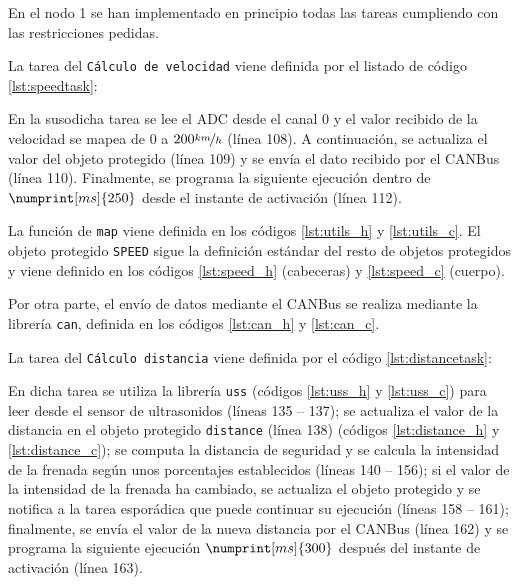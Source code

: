 En el nodo 1 se han implementado en principio todas las tareas cumpliendo con las
restricciones pedidas.

La tarea del \texttt{Cálculo de velocidad} viene definida por el listado de código
\ref{lst:speedtask}:



En la susodicha tarea se lee el ADC desde el canal 0 y el valor recibido de la velocidad
se mapea de $0$ a $200 \nicefrac{km}{h}$ (línea 108). A continuación, se actualiza el valor del
objeto protegido (línea 109) y se envía el dato recibido por el CANBus (línea 110).
Finalmente, se programa la siguiente ejecución dentro de $\numprint[ms]{250}$ desde el
instante de activación (línea 112).

La función de \texttt{map} viene definida en los códigos \ref{lst:utils_h} y \ref{lst:utils_c}.
El objeto protegido \texttt{SPEED} sigue la definición estándar del resto de objetos
protegidos y viene definido en los códigos \ref{lst:speed_h} (cabeceras) y \ref{lst:speed_c}
(cuerpo).

Por otra parte, el envío de datos mediante el CANBus se realiza mediante la librería
\texttt{can}, definida en los códigos \ref{lst:can_h} y \ref{lst:can_c}.

La tarea del \texttt{Cálculo distancia} viene definida por el código \ref{lst:distancetask}:



En dicha tarea se utiliza la librería \texttt{uss} (códigos \ref{lst:uss_h} y \ref{lst:uss_c})
para leer desde el sensor de ultrasonidos (líneas 135 -- 137); se actualiza el valor de la distancia en el
objeto protegido \texttt{distance} (línea 138) (códigos \ref{lst:distance_h} y \ref{lst:distance_c});
se computa la distancia de seguridad y se calcula la intensidad de la frenada
según unos porcentajes establecidos (líneas 140 -- 156); si el valor de la intensidad de
la frenada ha cambiado, se actualiza el objeto protegido y se notifica a la tarea
esporádica que puede continuar su ejecución (líneas 158 -- 161); finalmente, se
envía el valor de la nueva distancia por el CANBus (línea 162) y se programa la
siguiente ejecución $\numprint[ms]{300}$ después del instante de activación (línea 163).


